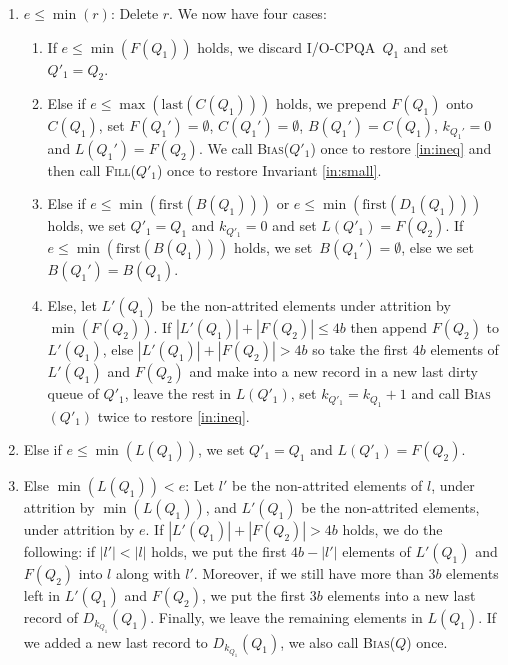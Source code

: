 \documentclass{sig-alternate}
\newcommand{\first}{\text{first}}
\newcommand{\last}{\text{last}}
\newcommand{\iref}[1]{\ref{#1}} \newcommand{\attr}[1]{\widetilde{#1}}
\renewcommand{\(}{\left(}
\renewcommand{\)}{\right)}
\begin{document}
\begin{enumerate}
  \item \label{it:Q1} $e \leq \min(r)$: Delete $r$. We now have four cases:
  \begin{enumerate}[label=\arabic*)]
    \item \label{it:Q1Cs} If $e \leq \min(F(Q_1))$ holds, we discard
      I/O-CPQA~$Q_1$ and set~$Q'_1 = Q_2$.

    \item \label{it:Q1lastCs} Else if $e \leq \max(\last(C(Q_1)))$ holds, we
      prepend $F(Q_1)$ onto $C(Q_1)$, set $F(Q_1') = \emptyset$, $C(Q_1') =
      \emptyset$, $B(Q_1') = C(Q_1)$, $k_{Q_1'} = 0$ and $L(Q_1') = F(Q_2)$.  We
      call \textsc{Bias}($Q'_1$) once to restore \iref{in:ineq} and then call
      \textsc{Fill}($Q'_1$) once to restore Invariant \iref{in:small}.

    \item \label{it:Bs} Else if $e \leq \min(\first(B(Q_1)))$ or $e \leq
      \min(\first(D_1(Q_1)))$ holds, we set $Q'_1=Q_1$
      and $k_{Q'_1} = 0$ and set $L(Q'_1) =
      F(Q_2)$. If $e \leq \min(\first(B(Q_1)))$ holds, we set~$B(Q_1') =
      \emptyset$, else we set $B(Q_1') = B(Q_1)$.

    \item \label{it:Ds} Else, let $L'(Q_1)$ be the non-attrited elements under
      attrition by $\min(F(Q_2))$. If $|L'(Q_1)| + |F(Q_2)| \leq 4b$ then append
      $F(Q_2)$ to $L'(Q_1)$, else $|L'(Q_1)| + |F(Q_2)| > 4b$ so take the first
      $4b$ elements of $L'(Q_1)$ and $F(Q_2)$ and make into a new record in a
      new last dirty queue of $Q'_1$, leave the rest in $L(Q'_1)$, set $k_{Q'_1}
      = k_{Q_1} + 1$ and call \textsc{Bias}$(Q'_1)$ twice to restore
      \iref{in:ineq}.



  \end{enumerate}

  \item \label{it:Ls} Else if $e \leq \min(L(Q_1))$, we set $Q'_1=Q_1$ and
    $L(Q'_1) = F(Q_2)$.

  \item \label{it:Latts} Else $\min(L(Q_1)) < e$: Let $l'$ be the
    non-attrited elements of $l$, under attrition by $\min(L(Q_1))$,
    and $L'(Q_1)$ be the non-attrited elements, under attrition by
    $e$. If $|L'(Q_1)| + |F(Q_2)| > 4b$ holds, we do the following: if
    $|l'| < |l|$ holds, we put the first $4b - |l'|$ elements of
    $L'(Q_1)$ and $F(Q_2)$ into $l$ along with $l'$. Moreover, if we
    still have more than $3b$ elements left in $L'(Q_1)$ and $F(Q_2)$,
    we put the first $3b$ elements into a new last record of
    $D_{k_{Q_1}}(Q_1)$. Finally, we leave the remaining elements in $L(Q_1)$. If
    we added a new last record to $D_{k_{Q_1}}(Q_1)$, we also  call
    \textsc{Bias}($Q$) once.
\end{enumerate}
\end{document}
